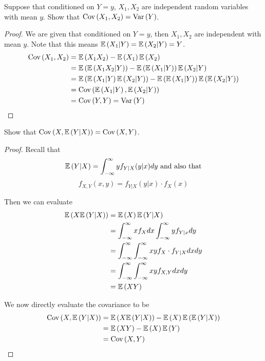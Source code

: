 \documentclass{exam}
\begin{document}
\begin{questions}
\newpage
\question
Suppose that conditioned on $Y = y$, $X_1, X_2$ are independent random variables with mean $y$. Show that $\cov{X_1}{X_2} = \var{Y}$.
\begin{proof}
    We are given that conditioned on $Y = y$, then $X_1, X_2$ are independent with mean $y$. Note that this means $\E{X_1 | Y} = \E{X_2 | Y} = Y$.
    \begin{align*}
        \cov{X_1}{X_2} &= \E{X_1X_2} - \E{X_1}\E{X_2} \\
        &= \E{\E{X_1X_2 | Y}} - \E{\E{X_1 | Y}}\E{X_2 | Y} \\
        &= \E{\E{X_1 | Y}\E{X_2 | Y}} - \E{\E{X_1 | Y}}\E{\E{X_2 | Y}} \\
        &= \cov{\E{X_1 | Y}}{\E{X_2 | Y}} \\
        &= \cov{Y}{Y} = \var{Y}
    \end{align*}
\end{proof}



\newpage
\question
Show that $\cov{X}{\E{Y | X}} = \cov{X}{Y}$.
\begin{proof}
    Recall that
    $$\E{Y | X} = \npint y f_{Y | X}(y | x) dy\text{ and also that}$$
    $$f_{X, Y}(x, y) = f_{Y | X}(y | x)\cdot f_X(x)$$

    Then we can evaluate
    \begin{align*}
        \E{X\E{Y | X}} &= \E{X}\E{Y | X} \\
        &= \npint x f_X dx\npint y f_{Y | x}dy \\
        &= \npint \npint xy f_X\cdot f_{Y | X}dxdy \\
        &= \npint \npint xy f_{X, Y} dxdy \\
        &= \E{XY}
    \end{align*}

    We now directly evaluate the covariance to be
    \begin{align*}
        \cov{X}{\E{Y | X}} &= \E{X\E{Y | X}} - \E{X}\E{\E{Y | X}} \\
        &= \E{XY} - \E{X}\E{Y}  \\
        &= \cov{X}{Y}
    \end{align*}
\end{proof}
\end{questions}
\end{document}
